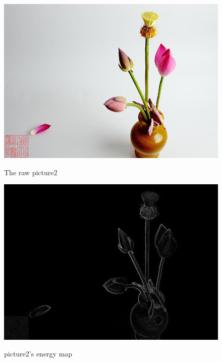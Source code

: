 \documentclass[final]{cvpr}
\begin{document}
\begin{figure}
\begin{center}
   \includegraphics[scale=0.9]{pics/1-1.jpg}
    \caption{The raw picture2}
    \label{pic1-1}
    \includegraphics[scale=0.2]{pics/1-0.png}
    \caption{picture2's energy map}

\end{center}
\end{figure}
\end{document}
